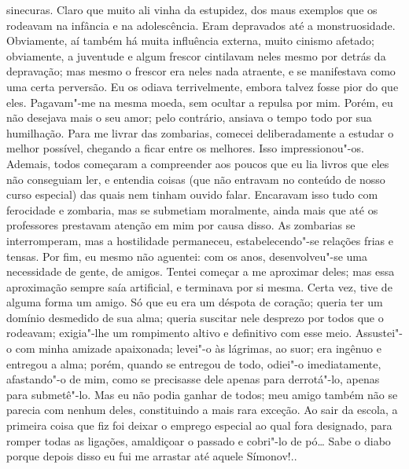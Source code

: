 sinecuras. Claro que muito ali vinha da estupidez, dos maus exemplos que
os rodeavam na infância e na adolescência. Eram depravados até a
monstruosidade. Obviamente, aí também há muita influência externa, muito
cinismo afetado; obviamente, a juventude e algum frescor cintilavam
neles mesmo por detrás da depravação; mas mesmo o frescor era neles nada
atraente, e se manifestava como uma certa perversão. Eu os odiava
terrivelmente, embora talvez fosse pior do que eles. Pagavam"-me na mesma
moeda, sem ocultar a repulsa por mim. Porém, eu não desejava mais o seu
amor; pelo contrário, ansiava o tempo todo por sua humilhação. Para me
livrar das zombarias, comecei deliberadamente a estudar o melhor
possível, chegando a ficar entre os melhores. Isso impressionou"-os.
Ademais, todos começaram a compreender aos poucos que eu lia livros que
eles não conseguiam ler, e entendia coisas (que não entravam no conteúdo
de nosso curso especial) das quais nem tinham ouvido falar. Encaravam
isso tudo com ferocidade e zombaria, mas se submetiam moralmente, ainda
mais que até os professores prestavam atenção em mim por causa disso. As
zombarias se interromperam, mas a hostilidade permaneceu,
estabelecendo"-se relações frias e tensas. Por fim, eu mesmo não
aguentei: com os anos, desenvolveu"-se uma necessidade de gente, de
amigos. Tentei começar a me aproximar deles; mas essa aproximação sempre
saía artificial, e terminava por si mesma. Certa vez, tive de alguma
forma um amigo. Só que eu era um déspota de coração; queria ter um
domínio desmedido de sua alma; queria suscitar nele desprezo por todos
que o rodeavam; exigia"-lhe um rompimento altivo e definitivo com esse
meio. Assustei"-o com minha amizade apaixonada; levei"-o às lágrimas, ao
suor; era ingênuo e entregou a alma; porém, quando se entregou de todo,
odiei"-o imediatamente, afastando"-o de mim, como se precisasse dele
apenas para derrotá"-lo, apenas para submetê"-lo. Mas eu não podia ganhar
de todos; meu amigo também não se parecia com nenhum deles, constituindo
a mais rara exceção. Ao sair da escola, a primeira coisa que fiz foi
deixar o emprego especial ao qual fora designado, para romper todas as
ligações, amaldiçoar o passado e cobri"-lo de pó\ldots{} Sabe o diabo porque
depois disso eu fui me arrastar até aquele Símonov!..

